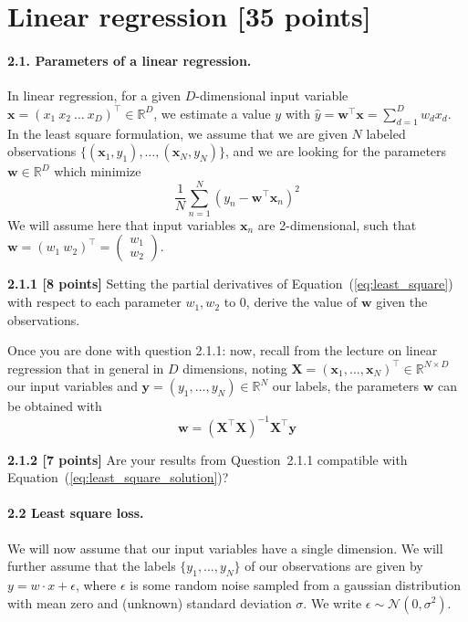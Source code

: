 \documentclass{article}
\begin{document}
\section{Linear regression [35 points]}

\paragraph{2.1. Parameters of a linear regression.} In linear regression, for a given $D$-dimensional input variable $\mathbf{x} = (x_1 ~x_2~\dots~x_D)^\top \in \mathbb{R}^D$, we estimate a value $y$ with
$\hat{y} = \mathbf{w}^\top \mathbf{x} = \sum_{d=1}^D w_d x_d$. In the least square formulation, we assume that we are given $N$ labeled observations $\{(\mathbf{x}_1, y_1), \dots, (\mathbf{x}_N, y_N)\}$, and we are looking for the parameters $\mathbf{w} \in \mathbb{R}^D$ which minimize
\begin{equation} \label{eq:least_square}
\frac{1}{N} \sum_{n=1}^N (y_n - \mathbf{w}^\top \mathbf{x}_n)^2
\end{equation}
We will assume here that input variables $\mathbf{x}_n$ are 2-dimensional, such that $\mathbf{w} = (w_1~w_2)^\top = \begin{pmatrix} w_1 \\ w_2 \end{pmatrix}$.

\noindent\textbf{2.1.1 [8 points]} Setting the partial derivatives of Equation~(\ref{eq:least_square}) with respect to each parameter $w_1, w_2$ to 0, derive the value of $\mathbf{w}$ given the observations.

Once you are done with question 2.1.1: now, recall from the lecture on linear regression that in general in $D$ dimensions, noting $\mathbf{X} = (\mathbf{x}_1, \dots, \mathbf{x}_N)^\top \in \mathbb{R}^{N \times D}$ our input variables and $\mathbf{y} = (y_1, \dots, y_N) \in \mathbb{R}^N$ our labels, the parameters $\mathbf{w}$ can be obtained with
\begin{equation} \label{eq:least_square_solution}
\mathbf{w} = (\mathbf{X}^\top\mathbf{X})^{-1}\mathbf{X}^\top\mathbf{y}
\end{equation}

\noindent\textbf{2.1.2 [7 points]} Are your results from Question~2.1.1 compatible with Equation~(\ref{eq:least_square_solution})?

\paragraph{2.2 Least square loss.} We will now assume that our input variables have a single dimension. We will further assume that the labels $\{y_1, \dots, y_N\}$ of our observations are given by $y = w \cdot x + \epsilon$, where $\epsilon$ is some random noise sampled from a gaussian distribution with mean zero and (unknown)  standard deviation $\sigma$. We write
$\epsilon \sim \mathcal{N}(0, \sigma^2)$.
\end{document}
